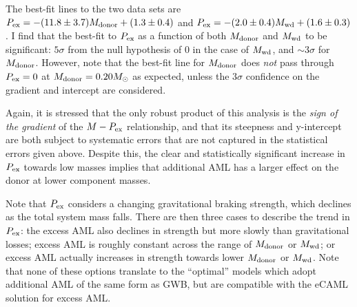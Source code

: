  The best-fit lines to the two data sets are $P_{\rm ex} = -(11.8\pm3.7) M_{\rm donor} + (1.3\pm0.4)$ and $P_{\rm ex} = -(2.0\pm0.4) M_{\rm wd} + (1.6\pm0.3)$.
I find that the best-fit to $P_{\rm ex}$ as a function of both $M_{\rm donor}$ and $M_{\rm wd}$ to be significant: $5\sigma$ from the null hypothesis of 0 in the case of $M_{\rm wd}$, and $\sim 3\sigma$ for $M_{\rm donor}$.
 However, note that the best-fit line for $M_{\rm donor}$ does \textit{not} pass through $P_{\rm ex} = 0$ at $M_{\rm donor} = 0.20 M_\odot$ as expected, unless the $3\sigma$ confidence on the gradient and intercept are considered.

Again, it is stressed that the only robust product of this analysis is the \textit{sign of the gradient} of the $M - P_{\rm ex}$ relationship, and that its steepness and y-intercept are both subject to systematic errors that are not captured in the statistical errors given above. Despite this, the clear and statistically significant increase in $P_{\rm ex}$ towards low masses implies that additional AML has a larger effect on the donor at lower component masses.

Note that $P_{\rm ex}$ considers a changing gravitational braking strength, which declines as the total system mass falls.
There are then three cases to describe the trend in $P_{\rm ex}$: the excess AML also declines in strength but more slowly than gravitational losses; excess AML is roughly constant across the range of $M_{\rm donor}$ or $M_{\rm wd}$; or excess AML actually increases in strength towards lower $M_{\rm donor}$ or $M_{\rm wd}$. Note that none of these options translate to the ``optimal'' \citet{knigge11} models which adopt additional AML of the same form as GWB, but are compatible with the eCAML solution for excess AML.


